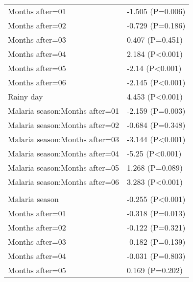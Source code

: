 \documentclass[]{article}
\begin{document}
\begin{longtable}[t]{ll}
\hspace{1em}Months after=01 & -1.505 (P=0.006)\\
\hspace{1em}Months after=02 & -0.729 (P=0.186)\\
\hspace{1em}Months after=03 & 0.407 (P=0.451)\\
\hspace{1em}Months after=04 & 2.184 (P<0.001)\\
\hspace{1em}Months after=05 & -2.14 (P<0.001)\\
\hspace{1em}Months after=06 & -2.145 (P<0.001)\\
\hspace{1em}Rainy day & 4.453 (P<0.001)\\
\hspace{1em}Malaria season:Months after=01 & -2.159 (P=0.003)\\
\hspace{1em}Malaria season:Months after=02 & -0.684 (P=0.348)\\
\hspace{1em}Malaria season:Months after=03 & -3.144 (P<0.001)\\
\hspace{1em}Malaria season:Months after=04 & -5.25 (P<0.001)\\
\hspace{1em}Malaria season:Months after=05 & 1.268 (P=0.089)\\
\hspace{1em}Malaria season:Months after=06 & 3.283 (P<0.001)\\
\addlinespace[1.5em]
\multicolumn{2}{l}{\textbf{Temporary field worker}}\\
\hspace{1em}Malaria season & -0.255 (P<0.001)\\
\hspace{1em}Months after=01 & -0.318 (P=0.013)\\
\hspace{1em}Months after=02 & -0.122 (P=0.321)\\
\hspace{1em}Months after=03 & -0.182 (P=0.139)\\
\hspace{1em}Months after=04 & -0.031 (P=0.803)\\
\hspace{1em}Months after=05 & 0.169 (P=0.202)\\

\end{longtable}
\end{document}
